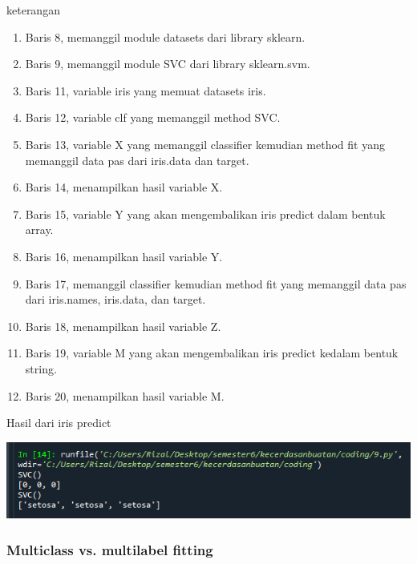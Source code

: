 \documentclass{article}
\begin{document}
keterangan
\begin{enumerate}
\item Baris 8, memanggil module datasets dari library sklearn.
\item Baris 9, memanggil module SVC dari library sklearn.svm.
\item Baris 11, variable iris yang memuat datasets iris.
\item Baris 12, variable clf yang memanggil method SVC.
\item Baris 13, variable X yang memanggil classifier kemudian method fit yang memanggil data pas dari iris.data dan target.
\item Baris 14, menampilkan hasil variable X.
\item Baris 15, variable Y yang akan mengembalikan iris predict dalam bentuk array.
\item Baris 16, menampilkan hasil variable Y.
\item Baris 17, memanggil classifier kemudian method fit yang memanggil data pas dari iris.names, iris.data, dan target.
\item Baris 18, menampilkan hasil variable Z.
\item Baris 19, variable M yang akan mengembalikan iris predict kedalam bentuk string.
\item Baris 20, menampilkan hasil variable M.
    \end{enumerate}

Hasil dari iris predict

\begin{center}
    \includegraphics[width=.8\textwidth]{figures/1184033/chapter1/22.PNG}
\end{center}

\subsubsection{Multiclass vs. multilabel fitting}
\end{document}

